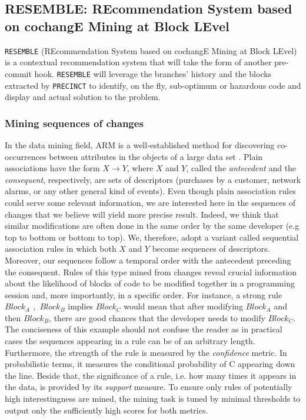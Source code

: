 
\subsection{RESEMBLE: REcommendation System based on cochangE Mining at Block LEvel\label{sec:RESEMBLE}}

{\tt RESEMBLE} (REcommendation System based on cochangE Mining at Block LEvel) is a contextual recommendation system that will take the form of another pre-commit hook. {\tt RESEMBLE} will leverage the branches' history and the blocks extracted by {\tt PRECINCT} to identify, on the fly, sub-optimum or hazardous code and display and actual solution to the problem.


\subsubsection{Mining sequences of changes}

In the data mining field, ARM is a
well-established method for discovering co-occurrences between attributes
in the objects of a large data set \cite{Gregory1991,HEIKKI1997}. Plain
associations have the form $X \rightarrow Y$, where $X$ and $Y$,
called the \textit{antecedent} and the \textit{consequent}, respectively, are sets of descriptors
(purchases by a customer, network alarms, or any other general kind of events).
Even though plain association rules could serve some relevant information, we are interested here in
the sequences of changes that we believe will yield more precise result. Indeed, we think that similar modifications are often done in the same order by the same developer (e.g top to bottom or bottom to top).
We, therefore, adopt a variant called sequential association rules in which
both $X$ and $Y$ become sequences of descriptors.
Moreover, our sequences follow a temporal order with the antecedent preceding the consequent.
Rules of this type mined from changes reveal crucial
information about the likelihood of blocks of code to be modified together in a programming session
and, more importantly, in a specific order.
For instance, a strong rule \emph{$Block_A$ $,$ $Block_B$} implies \emph{$Block_C$} would mean that after modifying $Block_A$ and then $Block_B$, there are good chances that the developer needs to modify $Block_C$.
The conciseness of this example should not confuse the reader as in practical cases
the sequences appearing in a rule can be of an arbitrary length.
Furthermore, the strength of the rule is measured by the \textit{confidence} metric.
In probabilistic terms,
it measures the conditional probability of C appearing down the line.
Beside that, the significance of a rule, i.e. how many times it appears in the data, is provided by its \textit{support} measure.
To ensure only rules of potentially high interestingness are mined,
the mining task is tuned by minimal thresholds to
output only the sufficiently high scores for both metrics.

